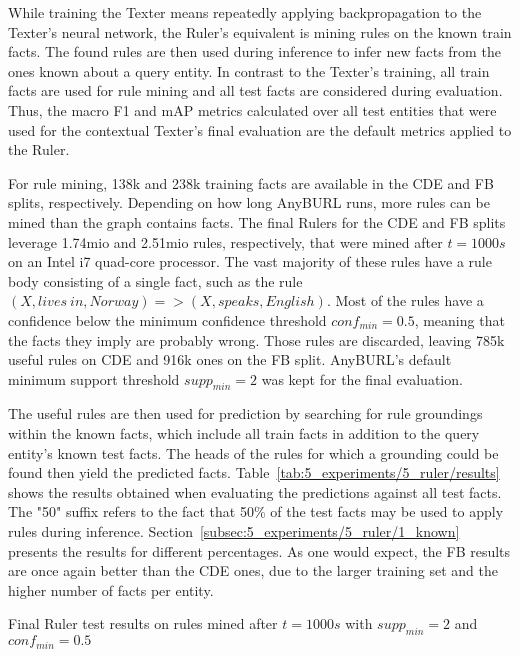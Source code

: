 While training the Texter means repeatedly applying backpropagation to the Texter's neural network, the Ruler's equivalent is mining rules on the known train facts. The found rules are then used during inference to infer new facts from the ones known about a query entity. In contrast to the Texter's training, all train facts are used for rule mining and all test facts are considered during evaluation. Thus, the macro F1 and mAP metrics calculated over all test entities that were used for the contextual Texter's final evaluation are the default metrics applied to the Ruler.

For rule mining, 138k and 238k training facts are available in the CDE and FB splits, respectively. Depending on how long AnyBURL runs, more rules can be mined than the graph contains facts. The final Rulers for the CDE and FB splits leverage 1.74mio and 2.51mio rules, respectively, that were mined after $t = 1000s$ on an Intel i7 quad-core processor. The vast majority of these rules have a rule body consisting of a single fact, such as the rule $(X, lives~in, Norway) => (X, speaks, English)$. Most of the rules have a confidence below the minimum confidence threshold $conf_{min} = 0.5$, meaning that the facts they imply are probably wrong. Those rules are discarded, leaving 785k useful rules on CDE and 916k ones on the FB split. AnyBURL's default minimum support threshold $supp_{min} = 2$ was kept for the final evaluation.

The useful rules are then used for prediction by searching for rule groundings within the known facts, which include all train facts in addition to the query entity's known test facts. The heads of the rules for which a grounding could be found then yield the predicted facts. Table~\ref{tab:5_experiments/5_ruler/results} shows the results obtained when evaluating the predictions against all test facts. The "50" suffix refers to the fact that 50\% of the test facts may be used to apply rules during inference. Section~\ref{subsec:5_experiments/5_ruler/1_known} presents the results for different percentages. As one would expect, the FB results are once again better than the CDE ones, due to the larger training set and the higher number of facts per entity.

\begin{table}[h]
    \centering
    
    \caption{Final Ruler test results on rules mined after $t = 1000s$ with $supp_{min} = 2$ and $conf_{min} = 0.5$}
    \label{tab:5_experiments/5_ruler/results}
\end{table}

